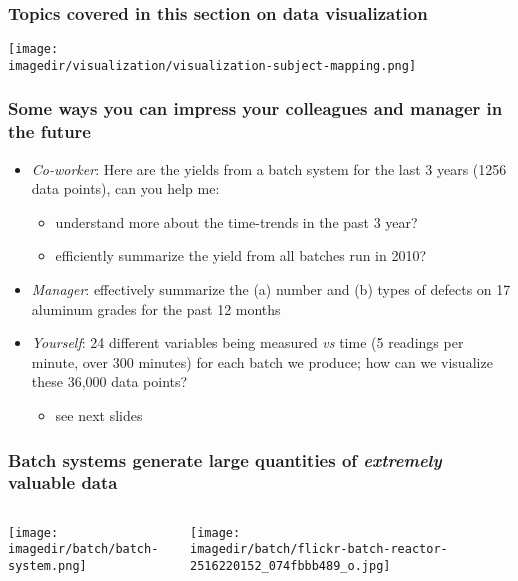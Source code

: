 \begin{frame}\frametitle{Topics covered in this section on data visualization}
	\begin{center}
		\texttt{[image: \\imagedir/visualization/visualization-subject-mapping.png]}
	\end{center}
\end{frame}

\begin{frame}\frametitle{Some ways you can impress your colleagues and manager in the future}
	\begin{itemize}
		\item	\emph{Co-worker}: Here are the yields from a batch system for the last 3 years (1256 data points), can you help me: 
		\begin{itemize}
			\item	understand more about the time-trends in the past 3 year? 
			\item	efficiently summarize the yield from all batches run in 2010?
		\end{itemize}
		\item	\emph{Manager}: effectively summarize the (a) number and (b) types of defects on 17 aluminum grades for the past 12 months 
		\item	\emph{Yourself}: 24 different variables being measured \emph{vs} time (5 readings per minute, over 300 minutes) for each batch we produce; how can we visualize these 36,000 data points? 
		\begin{itemize}
			\item	see next slides
		\end{itemize}
	\end{itemize}
\end{frame}

\begin{frame}\frametitle{Batch systems generate large quantities of \emph{extremely} valuable data}
	\begin{columns}[t]
			\begin{center}
				\texttt{[image: \\imagedir/batch/batch-system.png]}
			\end{center}
			
			\begin{center}
				\texttt{[image: \\imagedir/batch/flickr-batch-reactor-2516220152\_074fbbb489\_o.jpg]}
			\end{center}
	\end{columns}
\end{frame}

